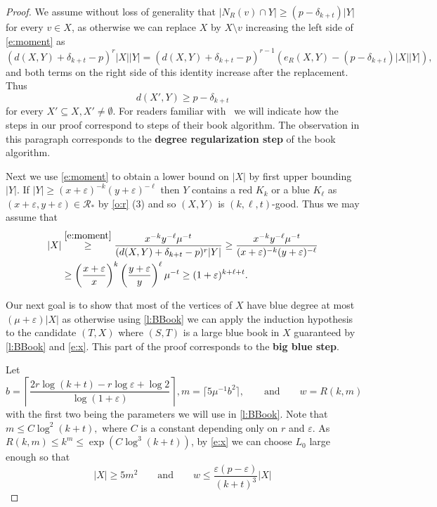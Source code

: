 \documentclass[reqno,final,12pt]{amsart}
\newcommand{\eps}{\varepsilon}
\newcommand{\mc}[1]{\mathcal{#1}}
\newcommand{\fs}[2]{\left(\frac{#1}{#2}\right)}
\begin{document}
\begin{proof}
We assume without loss of generality that $|N_R(v) \cap Y| \geq (p-\delta_{k+t})|Y|$ for every $v \in X$, as otherwise we can replace $X$ by $X \setminus v$ increasing the left side of \eqref{e:moment} as  $$(d(X,Y) + \delta_{k+t} - p)^r |X||Y| = (d(X,Y) + \delta_{k+t} - p)^{r-1}(e_R(X,Y)-(p-\delta_{k+t})|X||Y|),$$
and both terms on the right side of this identity increase after the replacement. Thus   \begin{equation}\label{e:degreg}d(X',Y) \geq p-\delta_{k+t}\end{equation}  for every $X' \subseteq X, X' \neq \emptyset.$ For readers familiar with~\cite{CGMS23} we will indicate  how the steps in our proof  correspond to steps of  their book algorithm. The observation in this paragraph corresponds to the \textbf{degree regularization step} of the book algorithm.

Next we use \eqref{e:moment} to obtain a lower bound on $|X|$ by first upper bounding $|Y|$. 
If $|Y| \geq (x+\eps)^{-k} (y + \eps)^{-\ell}$ then $Y$ contains a red $K_k$ or a blue $K_{\ell}$  as $(x+\eps, y +\eps) \in \mc{R_*}$ by \cref{o:r} (3) and so  $(X,Y)$ is $(k,\ell,t)$-good.
Thus we may assume that \begin{align} \label{e:x}|X| &\stackrel{\eqref{e:moment}}{\geq}  \frac{ x^{-k}y^{-\ell}\mu^{-t }}{(d(X,Y) + \delta_{k+t} - p)^r|Y|} \geq \frac{ x^{-k}y^{-\ell}\mu^{-t }}{ (x+\eps)^{-k} (y +\eps)^{-\ell}} \notag\\& \geq \fs{x+\eps}{x}^k\fs{y+\eps}{y}^{\ell}\mu^{-t} \geq (1+\eps)^{k +\ell+t}.\end{align}

Our next goal is to show that most of the vertices of $X$ have blue degree at most $(\mu+\eps)|X|$ as otherwise using \cref{l:BBook}  we can apply the induction hypothesis to the candidate $(T,X)$ where $(S,T)$ is a large blue book in $X$ guaranteed by 
\cref{l:BBook} and \eqref{e:x}. This part of the proof corresponds to the \textbf{big blue step}.

Let $$b =\left\lceil \frac{2r \log(k+t)- r\log{\eps} + \log{2}}{\log(1+\eps)}\right \rceil,  m = \lceil  5\mu^{-1}b^2 \rceil, \qquad \mathrm{and} \qquad w=R(k,m) $$
with the first two being the parameters we will use in  \cref{l:BBook}.
Note that $m \leq C\log^2(k+t),$ where $C$ is a constant depending only on $r$ and $\eps$.  As $R(k,m) \leq k^m \leq \exp(C\log^3(k+t))$, by \eqref{e:x} we can choose $L_0$ large enough so that \begin{equation}\label{e:x2}|X| \geq 5m^2 \qquad \mathrm{and} \qquad
w \leq \frac{\eps(p-\eps)}{(k+t)^3}|X|\end{equation}


\end{proof}
\end{document}
